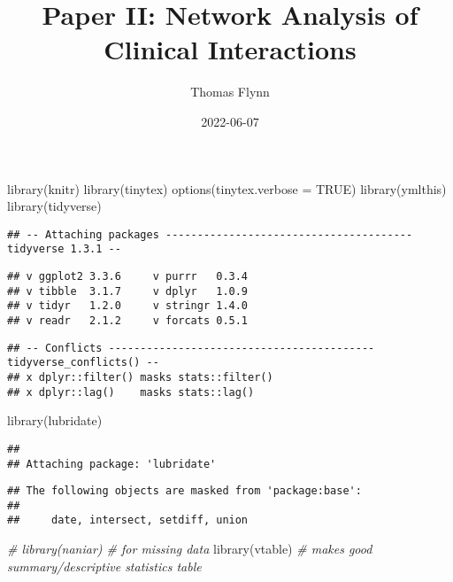 \documentclass[
]{article}
\title{Paper II: Network Analysis of Clinical Interactions}
\author{Thomas Flynn}
\date{2022-06-07}
\newenvironment{Shaded}{\begin{snugshade}}{\end{snugshade}}
\newcommand{\AttributeTok}[1]{\textcolor[rgb]{0.77,0.63,0.00}{#1}}
\newcommand{\CommentTok}[1]{\textcolor[rgb]{0.56,0.35,0.01}{\textit{#1}}}
\newcommand{\ConstantTok}[1]{\textcolor[rgb]{0.00,0.00,0.00}{#1}}
\newcommand{\FunctionTok}[1]{\textcolor[rgb]{0.00,0.00,0.00}{#1}}
\newcommand{\NormalTok}[1]{#1}
\begin{document}
\maketitle

{
\setcounter{tocdepth}{2}
\tableofcontents
}
\begin{Shaded}
\begin{Highlighting}[]
\FunctionTok{library}\NormalTok{(knitr)}
\FunctionTok{library}\NormalTok{(tinytex)}
\FunctionTok{options}\NormalTok{(}\AttributeTok{tinytex.verbose =} \ConstantTok{TRUE}\NormalTok{)}
\FunctionTok{library}\NormalTok{(ymlthis)}
\FunctionTok{library}\NormalTok{(tidyverse)}
\end{Highlighting}
\end{Shaded}

\begin{verbatim}
## -- Attaching packages --------------------------------------- tidyverse 1.3.1 --
\end{verbatim}

\begin{verbatim}
## v ggplot2 3.3.6     v purrr   0.3.4
## v tibble  3.1.7     v dplyr   1.0.9
## v tidyr   1.2.0     v stringr 1.4.0
## v readr   2.1.2     v forcats 0.5.1
\end{verbatim}

\begin{verbatim}
## -- Conflicts ------------------------------------------ tidyverse_conflicts() --
## x dplyr::filter() masks stats::filter()
## x dplyr::lag()    masks stats::lag()
\end{verbatim}

\begin{Shaded}
\begin{Highlighting}[]
\FunctionTok{library}\NormalTok{(lubridate)}
\end{Highlighting}
\end{Shaded}

\begin{verbatim}
## 
## Attaching package: 'lubridate'
\end{verbatim}

\begin{verbatim}
## The following objects are masked from 'package:base':
## 
##     date, intersect, setdiff, union
\end{verbatim}

\begin{Shaded}
\begin{Highlighting}[]
\CommentTok{\# library(naniar) \# for missing data}
\FunctionTok{library}\NormalTok{(vtable) }\CommentTok{\# makes good summary/descriptive statistics table}
\end{Highlighting}
\end{Shaded}
\end{document}
